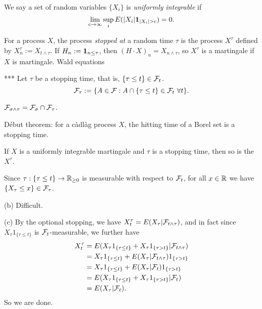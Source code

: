 \documentclass{../../large}
\newcommand{\cadlag}{c\`adl\`ag }
\begin{document}
\begin{prb}
We say a set of random variables $\{X_i\}$ is \emph{uniformly integrable} if
\[\lim_{c\to\infty}\sup_iE(|X_i|\1_{|X_i|>c})=0.\]
\end{prb}


\begin{prb}
For a process $X$, the process \emph{stopped at} a random time $\tau$ is the process $X^\tau$ defined by $X^\tau_n:=X_{t\wedge\tau}$.
If $H_n:=\mathbf{1}_{n\le\tau}$, then $(H\cdot X)_n=X_{n\wedge\tau}$, so $X^\tau$ is a martingale if $X$ is martingale.
Wald equations
\end{prb}

\begin{prb}***
Let $\tau$ be a stopping time, that is, $\{\tau\le t\}\in\mathcal{F}_t$.
\[\cF_\tau:=\{A\in\cF:A\cap\{\tau\le t\}\in\cF_t\ \forall t\}.\]
\begin{parts}
\item $\mathcal{F}_{\sigma\wedge\tau}=\mathcal{F}_\sigma\cap\mathcal{F}_\tau$.
\item D\'ebut theorem: for a \cadlag process $X$, the hitting time of a Borel set is a stopping time.
\item If $X$ is a uniformly integrable martingale and $\tau$ is a stopping time, then so is the $X^\tau$.
\end{parts}
\end{prb}
\begin{pf}
Since $\tau:\{\tau\le t\}\to\mathbb{R}_{\ge0}$ is measurable with respect to $\mathcal{F}_t$, for all $x\in\mathbb{R}$ we have $\{X_\tau\le x\}\in\mathcal{F}_\tau$.

(b)
Difficult.

(c)
By the optional stopping, we have $X^\tau_t=E(X_\tau|\mathcal{F}_{t\wedge\tau})$, and in fact since $X_\tau1_{\{\tau\le t\}}$ is $\mathcal{F}_t$-measurable, we further have
\begin{align*}
X^\tau_t&=E(X_\tau1_{\{\tau\le t\}}+X_\tau1_{\{\tau>t\}}|\mathcal{F}_{t\wedge\tau})\\
&=X_\tau1_{\{\tau\le t\}}+E(X_\tau|\mathcal{F}_{t\wedge\tau})1_{\{\tau>t\}}\\
&=X_\tau1_{\{\tau\le t\}}+E(X_\tau|\mathcal{F}_t)1_{\{\tau>t\}}\\
&=E(X_\tau1_{\{\tau\le t\}}+X_\tau1_{\{\tau>t\}}|\mathcal{F}_t)\\
&=E(X_\tau|\mathcal{F}_t).
\end{align*}
So we are done.
\end{pf}
\end{document}
